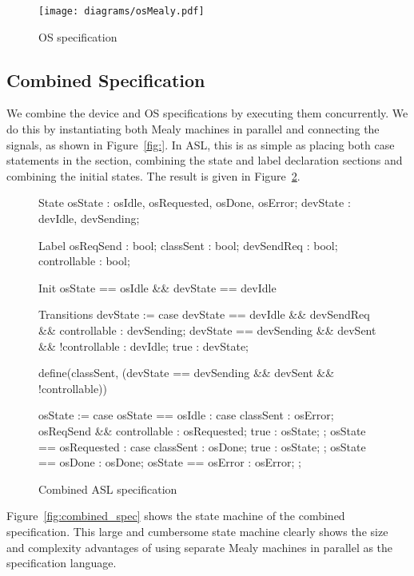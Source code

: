 \begin{figure}
\centering
\texttt{[image: diagrams/osMealy.pdf]}
\caption{OS specification}
\label{fig:os_spec_mealy}
\end{figure}

\subsection{Combined Specification}

We combine the device and OS specifications by executing them concurrently. We do this by instantiating both Mealy machines in parallel and connecting the signals, as shown in Figure~\ref{fig:}. In ASL, this is as simple as placing both case statements in the  section, combining the state and label declaration sections and combining the initial states. The result is given in Figure~\ref{fig:combined_spec_asl}.

\begin{figure}
\centering
\begin{asllisting}
State
osState  : {osIdle, osRequested, osDone, osError};
devState : {devIdle, devSending};

Label
osReqSend    : bool;
classSent    : bool;
devSendReq   : bool;
controllable : bool;

Init
osState == osIdle && devState == devIdle

Transitions
devState := case {
    devState == devIdle && devSendReq && controllable  : devSending;
    devState == devSending && devSent && !controllable : devIdle;
    true                                               : devState;
}

define(classSent, (devState == devSending && devSent && !controllable)) 

osState := case {
    osState == osIdle :
        case {
            classSent                 : osError;
            osReqSend && controllable : osRequested;
            true                      : osState;
        };
    osState == osRequested :
        case {
            classSent : osDone; 
            true      : osState;
        };
    osState == osDone  : osDone;
    osState == osError : osError;
};
 
\end{asllisting}
\caption{Combined ASL specification}
\label{fig:combined_spec_asl}
\end{figure}

Figure~\ref{fig:combined_spec} shows the state machine of the combined specification. This large and cumbersome state machine clearly shows the size and complexity advantages of using separate Mealy machines in parallel as the specification language.

